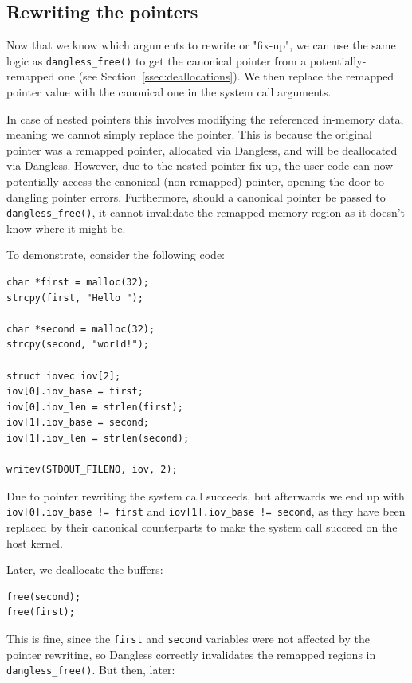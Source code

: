 \subsection{Rewriting the pointers}

Now that we know which arguments to rewrite or "fix-up", we can use the same logic as \lstinline!dangless_free()! to get the canonical pointer from a potentially-remapped one (see Section~\ref{ssec:deallocations}). We then replace the remapped pointer value with the canonical one in the system call arguments.

In case of nested pointers this involves modifying the referenced in-memory data, meaning we cannot simply replace the pointer. This is because the original pointer was a remapped pointer, allocated via Dangless, and will be deallocated via Dangless. However, due to the nested pointer fix-up, the user code can now potentially access the canonical (non-remapped) pointer, opening the door to dangling pointer errors. Furthermore, should a canonical pointer be passed to \lstinline!dangless_free()!, it cannot invalidate the remapped memory region as it doesn't know where it might be.

To demonstrate, consider the following code:

\begin{lstlisting}
char *first = malloc(32);
strcpy(first, "Hello ");

char *second = malloc(32);
strcpy(second, "world!");

struct iovec iov[2];
iov[0].iov_base = first;
iov[0].iov_len = strlen(first);
iov[1].iov_base = second;
iov[1].iov_len = strlen(second);

writev(STDOUT_FILENO, iov, 2);
\end{lstlisting}

Due to pointer rewriting the system call succeeds, but afterwards we end up with \lstinline|iov[0].iov_base != first| and \lstinline|iov[1].iov_base != second|, as they have been replaced by their canonical counterparts to make the system call succeed on the host kernel.

Later, we deallocate the buffers:

\begin{lstlisting}
free(second);
free(first);
\end{lstlisting}

This is fine, since the \lstinline!first! and \lstinline!second! variables were not affected by the pointer rewriting, so Dangless correctly invalidates the remapped regions in \lstinline!dangless_free()!. But then, later:

